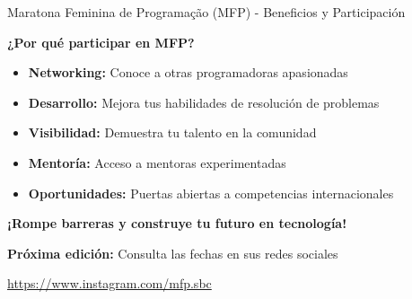 \documentclass{beamer}
\begin{document}
\begin{frame}{Maratona Feminina de Programação (MFP) - Beneficios y Participación}
\begin{center}
\Large
\textbf{¿Por qué participar en MFP?}

\vspace{0.1cm}

\normalsize
\begin{itemize}
\item \textbf{Networking:} Conoce a otras programadoras apasionadas
\item \textbf{Desarrollo:} Mejora tus habilidades de resolución de problemas
\item \textbf{Visibilidad:} Demuestra tu talento en la comunidad
\item \textbf{Mentoría:} Acceso a mentoras experimentadas
\item \textbf{Oportunidades:} Puertas abiertas a competencias internacionales
\end{itemize}

\vspace{0.1cm}

\textbf{¡Rompe barreras y construye tu futuro en tecnología!}

\normalsize
\textbf{Próxima edición:} Consulta las fechas en sus redes sociales

\small
\url{https://www.instagram.com/mfp.sbc}
\end{center}
\end{frame}
\end{document}
